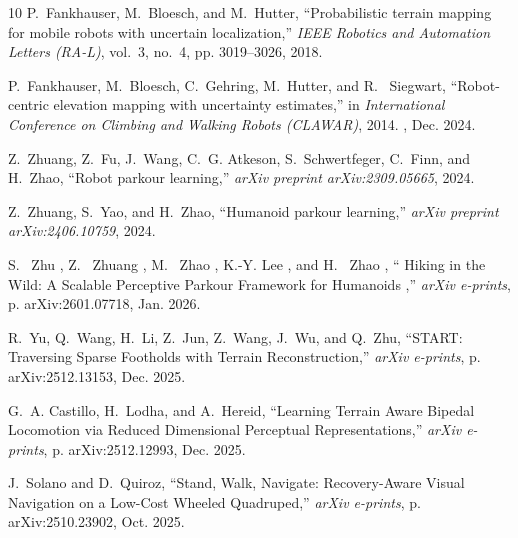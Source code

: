 \documentclass[letterpaper, 10 pt, conference]{ieeeconf/ieeeconf}
\providecommand{\DIFadd}[1]{{\protect\color{blue} \sf #1}} %
\providecommand{\DIFdel}[1]{{\protect\color{red} \scriptsize #1}} %
\providecommand{\DIFaddbegin}{} %
\providecommand{\DIFaddend}{} %
\providecommand{\DIFdelbegin}{} %
\providecommand{\DIFdelend}{} %
\begin{document}
\begin{thebibliography}{10}
\DIFdel{P.~Fankhauser, M.~Bloesch, and M.~Hutter, ``Probabilistic terrain mapping for
  mobile robots with uncertain localization,'' \emph{IEEE Robotics and
  Automation Letters (RA-L)}, vol.~3, no.~4, pp. 3019--3026, 2018.
}%

\DIFdel{P.~Fankhauser, M.~Bloesch, C.~Gehring, M.~Hutter, and R. ~Siegwart,
  ``Robot-centric elevation mapping with uncertainty estimates,'' in
  \emph{International Conference on Climbing and Walking Robots (CLAWAR)},
  2014.
}\DIFdelend \DIFaddbegin \DIFadd{2412.03353, Dec. 2024.
}\DIFaddend 

Z.~Zhuang, Z.~Fu, J.~Wang, C.~G. Atkeson, S.~Schwertfeger, C.~Finn, and
  H.~Zhao, ``Robot parkour learning,'' \emph{arXiv preprint arXiv:2309.05665},
  2024.

Z.~Zhuang, S.~Yao, and H.~Zhao, ``Humanoid parkour learning,'' \emph{arXiv
  preprint arXiv:2406.10759}, 2024.

\DIFdelbegin {}
\DIFdel{S.~}%
\DIFdel{Zhu}%
\DIFdel{, Z.~}%
\DIFdel{Zhuang}%
\DIFdel{, M.~}%
\DIFdel{Zhao}%
\DIFdel{, K.-Y. }%
\DIFdel{Lee}%
\DIFdel{, and H.~}%
\DIFdel{Zhao}%
\DIFdel{, ``}%
\DIFdel{Hiking in the
  Wild: A Scalable Perceptive Parkour Framework for Humanoids}%
\DIFdel{,'' \emph{arXiv
  e-prints}, p. arXiv:2601.07718, Jan. 2026.
}%

\DIFdelend {}
R.~{Yu}, Q.~{Wang}, H.~{Li}, Z.~{Jun}, Z.~{Wang}, J.~{Wu}, and Q.~{Zhu},
  ``{START: Traversing Sparse Footholds with Terrain Reconstruction},''
  \emph{arXiv e-prints}, p. arXiv:2512.13153, Dec. 2025.

G.~A. {Castillo}, H.~{Lodha}, and A.~{Hereid}, ``{Learning Terrain Aware
  Bipedal Locomotion via Reduced Dimensional Perceptual Representations},''
  \emph{arXiv e-prints}, p. arXiv:2512.12993, Dec. 2025.

J.~{Solano} and D.~{Quiroz}, ``{Stand, Walk, Navigate: Recovery-Aware Visual
  Navigation on a Low-Cost Wheeled Quadruped},'' \emph{arXiv e-prints}, p.
  arXiv:2510.23902, Oct. 2025.


\end{thebibliography}
\end{document}
